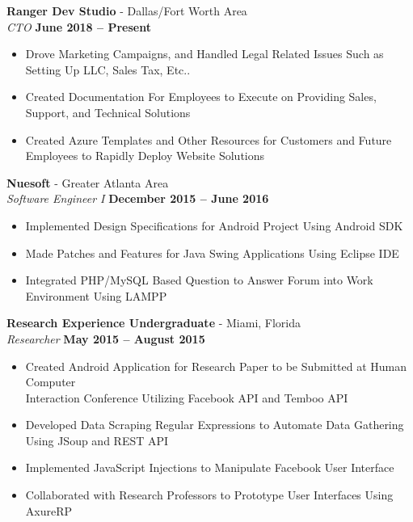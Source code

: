 \documentclass[margin,line]{resume}
\begin{document}
\begin{resume}
	\textbf{Ranger Dev Studio} - Dallas/Fort Worth Area \vspace{1mm}\\\vspace{1mm}
\textsl{CTO} \hfill \textbf{June 2018 -- Present}
\begin{itemize}
	\item Drove Marketing Campaigns, and Handled Legal Related Issues Such as Setting Up LLC, Sales Tax, Etc..
	\item Created Documentation For Employees to Execute on Providing Sales, Support, and Technical Solutions
	\item Created Azure Templates and Other Resources for Customers and Future Employees to Rapidly Deploy Website Solutions
	
\end{itemize}
	\textbf{Nuesoft} - Greater Atlanta Area \vspace{1mm}\\\vspace{1mm}%
	\textsl{Software Engineer I} \hfill \textbf{December 2015 -- June 2016}
	\begin{itemize}
	 	\item Implemented Design Specifications for Android Project Using Android SDK
	 	\item Made Patches and Features for Java Swing Applications Using Eclipse IDE 
	 	\item Integrated PHP/MySQL Based Question to Answer Forum into Work Environment Using LAMPP
	\end{itemize}

	\textbf{Research Experience Undergraduate} - Miami, Florida \vspace{1mm}\\\vspace{1mm}%
	\textsl{Researcher} \hfill \textbf{May 2015 -- August 2015}
	\begin{itemize}
		\item Created Android Application for Research Paper to be Submitted at Human Computer\\
		Interaction Conference Utilizing Facebook API and Temboo API
		\item Developed Data Scraping Regular Expressions to Automate Data Gathering Using JSoup and REST API
		\item Implemented JavaScript Injections to Manipulate Facebook User Interface
		\item Collaborated with Research Professors to Prototype User Interfaces Using AxureRP
	\end{itemize}

\end{resume}
\end{document}

